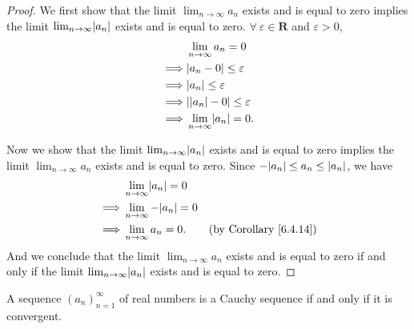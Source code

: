\begin{proof}
We first show that the limit \(\lim_{n \to \infty} a_n\) exists and is equal to zero implies the limit \(\lim_{n \to \infty} \abs*{a_n}\) exists and is equal to zero.
\(\forall\ \varepsilon \in \mathbf{R}\) and \(\varepsilon > 0\),
\begin{align*}
& \lim_{n \to \infty} a_n = 0 \\
\implies & \abs*{a_n - 0} \leq \varepsilon \\
\implies & \abs*{a_n} \leq \varepsilon \\
\implies & \abs*{\abs*{a_n} - 0} \leq \varepsilon \\
\implies & \lim_{n \to \infty} \abs*{a_n} = 0.
\end{align*}

Now we show that the limit \(\lim_{n \to \infty} \abs*{a_n}\) exists and is equal to zero implies the limit \(\lim_{n \to \infty} a_n\) exists and is equal to zero.
Since \(-\abs*{a_n} \leq a_n \leq \abs*{a_n}\), we have
\begin{align*}
& \lim_{n \to \infty} \abs*{a_n} = 0 \\
\implies & \lim_{n \to \infty} -\abs*{a_n} = 0 \\
\implies & \lim_{n \to \infty} a_n = 0. & \text{(by Corollary \ref{6.4.14})}
\end{align*}
And we conclude that the limit \(\lim_{n \to \infty} a_n\) exists and is equal to zero if and only if the limit \(\lim_{n \to \infty} \abs*{a_n}\) exists and is equal to zero.
\end{proof}

\begin{theorem}\label{6.4.18}
A sequence \((a_n)_{n = 1}^\infty\) of real numbers is a Cauchy sequence if and only if it is convergent.
\end{theorem}

